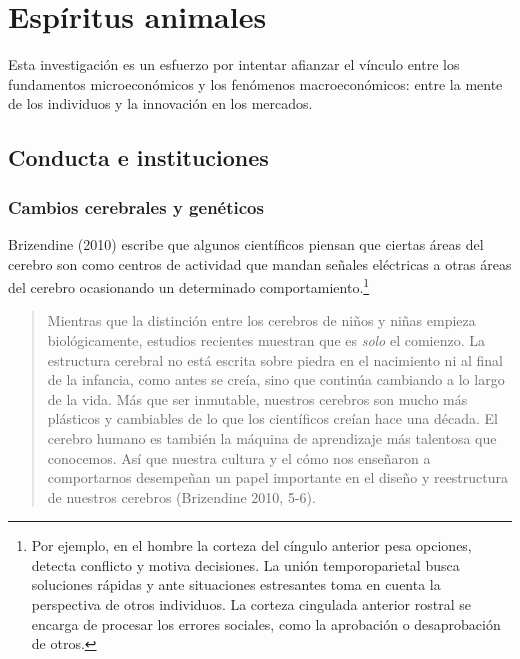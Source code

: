 \chapter{Espíritus animales}

\noindent Esta investigación es un esfuerzo por intentar afianzar el vínculo entre los fundamentos microeconómicos y los fenómenos macroeconómicos: entre la mente de los individuos y la innovación en los mercados. 

\newpage

\section{Conducta e instituciones}

\subsection{Cambios cerebrales y genéticos}

\noindent Brizendine (2010) escribe que algunos científicos piensan que ciertas áreas del cerebro son como centros de actividad que mandan señales eléctricas a otras áreas del cerebro ocasionando un determinado comportamiento.\footnote{ Por ejemplo, en el hombre la corteza del cíngulo anterior pesa opciones, detecta conflicto y motiva decisiones. La unión temporoparietal busca soluciones rápidas y ante situaciones estresantes toma en cuenta la perspectiva de otros individuos. La corteza cingulada anterior rostral se encarga de procesar los errores sociales, como la aprobación o desaprobación de otros.}

\begin{quote}
    \small{Mientras que la distinción entre los cerebros de niños y niñas empieza biológicamente, estudios recientes muestran que es \textit{solo} el comienzo. La estructura cerebral no está escrita sobre piedra en el nacimiento ni al final de la infancia, como antes se creía, sino que continúa cambiando a lo largo de la vida. Más que ser inmutable, nuestros cerebros son mucho más plásticos y cambiables de lo que los científicos creían hace una década. El cerebro humano es también la máquina de aprendizaje más talentosa que conocemos. Así que nuestra cultura y el cómo nos enseñaron a comportarnos desempeñan un papel importante en el diseño y reestructura de nuestros cerebros (Brizendine 2010, 5-6).}
\end{quote}


